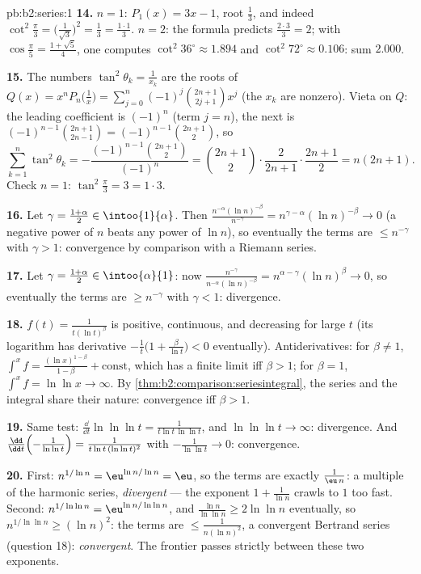\begin{solution}{pb:b2:series:1}
\textbf{14.} $n = 1$: $P_1(x) = 3x - 1$, root $\frac13$, and
indeed $\cot^2\frac\pi3 = \bigl(\frac1{\sqrt3}\bigr)^2 =
\frac13 = \frac{1\cdot1}3$. $n = 2$: the formula predicts
$\frac{2\cdot3}3 = 2$; with $\cos\frac\pi5 = \frac{1 +
\sqrt5}{4}$, one computes $\cot^2 36^\circ \approx 1.894$ and
$\cot^2 72^\circ \approx 0.106$: sum $2.000$.

\textbf{15.} The numbers $\tan^2\theta_k = \frac1{x_k}$ are the
roots of $Q(x) = x^nP_n\bigl(\frac1x\bigr) =
\sum_{j=0}^n(-1)^j\binom{2n+1}{2j+1}x^j$ (the $x_k$ are
nonzero). Vieta on $Q$: the leading coefficient is $(-1)^n$
(term $j = n$), the next is $(-1)^{n-1}\binom{2n+1}{2n-1} =
(-1)^{n-1}\binom{2n+1}{2}$, so
\[
\sum_{k=1}^n\tan^2\theta_k =
-\frac{(-1)^{n-1}\binom{2n+1}2}{(-1)^n} = \binom{2n+1}2\cdot
\frac{2}{2n+1}\cdot\frac{2n+1}{2}
= n(2n+1).
\]
Check $n = 1$: $\tan^2\frac\pi3 = 3 = 1\cdot3$.

\textbf{16.} Let $\gamma = \frac{1+\alpha}2 \in
\intoo{1}{\alpha}$. Then $\frac{n^{-\alpha}(\ln
n)^{-\beta}}{n^{-\gamma}} = n^{\gamma - \alpha}(\ln n)^{-\beta}
\to 0$ (a negative power of $n$ beats any power of $\ln n$), so
eventually the terms are $\leq n^{-\gamma}$ with $\gamma > 1$:
convergence by comparison with a Riemann series.

\textbf{17.} Let $\gamma = \frac{1+\alpha}2 \in
\intoo{\alpha}{1}$: now $\frac{n^{-\gamma}}{n^{-\alpha}(\ln
n)^{-\beta}} = n^{\alpha-\gamma}(\ln n)^{\beta} \to 0$, so
eventually the terms are $\geq n^{-\gamma}$ with $\gamma < 1$:
divergence.

\textbf{18.} $f(t) = \frac1{t(\ln t)^\beta}$ is positive,
continuous, and decreasing for large $t$ (its logarithm has
derivative $-\frac1t\bigl(1 + \frac{\beta}{\ln t}\bigr) < 0$
eventually). Antiderivatives: for $\beta \neq 1$,
$\int^x f = \frac{(\ln x)^{1-\beta}}{1-\beta} + \text{const}$,
which has a finite limit iff $\beta > 1$; for $\beta = 1$,
$\int^x f = \ln\ln x \to \infty$. By
\cref{thm:b2:comparison:seriesintegral}, the series and the
integral share their nature: convergence iff $\beta > 1$.

\textbf{19.} Same test: $\frac{\dd}{\dd t}\ln\ln\ln t =
\frac{1}{t\ln t\,\ln\ln t}$, and $\ln\ln\ln t \to \infty$:
divergence. And $\frac{\dd}{\dd t}\Bigl(-\frac1{\ln\ln t}\Bigr)
= \frac{1}{t\ln t\,(\ln\ln t)^2}$ with $-\frac1{\ln\ln t} \to
0$: convergence.

\textbf{20.} First: $n^{1/\ln n} = \eu^{\ln n/\ln n} = \eu$, so
the terms are exactly $\frac{1}{\eu\,n}$: a multiple of the
harmonic series, \emph{divergent} --- the exponent $1 +
\frac1{\ln n}$ crawls to $1$ too fast. Second: $n^{1/\ln\ln n}
= \eu^{\ln n/\ln\ln n}$, and $\frac{\ln n}{\ln\ln n} \geq
2\ln\ln n$ eventually, so $n^{1/\ln\ln n} \geq (\ln n)^2$: the
terms are $\leq \frac1{n(\ln n)^2}$, a convergent Bertrand
series (question 18): \emph{convergent}. The frontier passes
strictly between these two exponents.


\end{solution}
